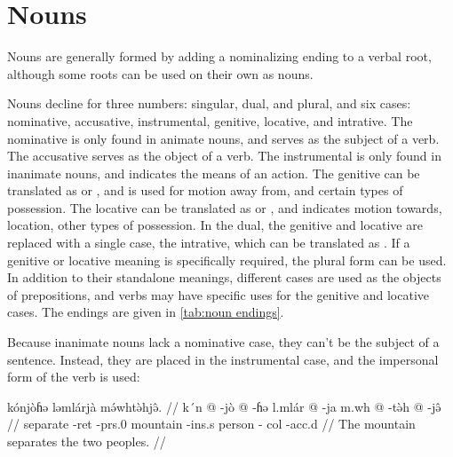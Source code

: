 \section{Nouns}

Nouns are generally formed by adding a nominalizing ending to a verbal root,
although some roots can be used on their own as nouns.

Nouns decline for three numbers: singular, dual, and plural, and six cases:
nominative, accusative, instrumental, genitive, locative, and intrative. The
nominative is only found in animate nouns, and serves as the subject of a verb.
The accusative serves as the object of a verb. The instrumental is only found
in inanimate nouns, and indicates the means of an action. The genitive can be
translated as  or , and is used for motion away from, and
certain types of possession. The locative can be translated as  or
, and indicates motion towards, location, other types of possession. In
the dual, the genitive and locative are replaced with a single case, the
intrative, which can be translated as . If a genitive or locative
meaning is specifically required, the plural form can be used. In addition to
their standalone meanings, different cases are used as the objects of
prepositions, and verbs may have specific uses for the genitive and locative
cases. The endings are given in \cref{tab:noun endings}.

Because inanimate nouns lack a nominative case, they can't be the subject of a
sentence. Instead, they are placed in the instrumental case, and the impersonal
form of the verb is used:

\ex
\begingl
    \glpreamble kónjòɦə ləmlárjà mə́whtə̀hjə̂. //
    \gla k´n @ -jò @ -ɦə l.mlár @ -ja m.wh @ -tə̀h @ -jə̂ //
    \glb separate -{\sc ret} -{\sc prs}.0 mountain -{\sc ins}.s person -{\sc
        col} -{\sc acc}.d //
    \glft The mountain separates the two peoples. //
\endgl
\xe

